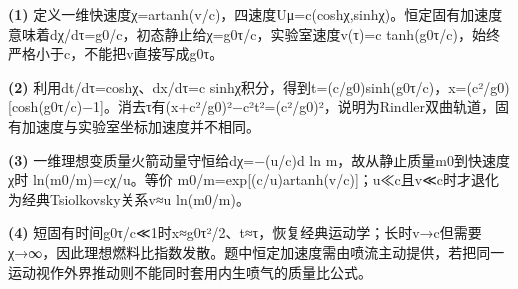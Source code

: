 \par\noindent\textbf{(1)} 定义一维快速度χ=artanh(v/c)，四速度Uμ=c(coshχ,sinhχ)。恒定固有加速度意味着dχ/dτ=g0/c，初态静止给χ=g0τ/c，实验室速度v(τ)=c tanh(g0τ/c)，始终严格小于c，不能把v直接写成g0τ。
\par\noindent\textbf{(2)} 利用dt/dτ=coshχ、dx/dτ=c sinhχ积分，得到t=(c/g0)sinh(g0τ/c)，x=(c²/g0)[cosh(g0τ/c)−1]。消去τ有(x+c²/g0)²−c²t²=(c²/g0)²，说明为Rindler双曲轨道，固有加速度与实验室坐标加速度并不相同。
\par\noindent\textbf{(3)} 一维理想变质量火箭动量守恒给dχ=−(u/c)d ln m，故从静止质量m0到快速度χ时 ln(m0/m)=cχ/u。等价 m0/m=exp[(c/u)artanh(v/c)]；u≪c且v≪c时才退化为经典Tsiolkovsky关系v≈u ln(m0/m)。
\par\noindent\textbf{(4)} 短固有时间g0τ/c≪1时x≈g0τ²/2、t≈τ，恢复经典运动学；长时v→c但需要χ→∞，因此理想燃料比指数发散。题中恒定加速度需由喷流主动提供，若把同一运动视作外界推动则不能同时套用内生喷气的质量比公式。
